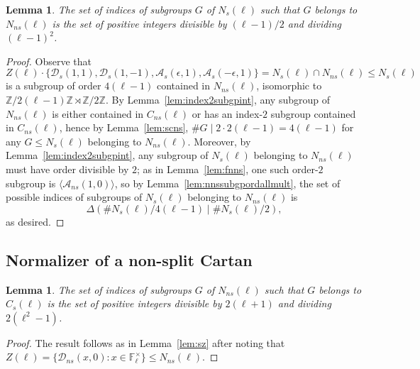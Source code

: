 \documentclass[table,dvipsnames]{amsart}
\newcommand{\F}{\mathbb{F}}
\newcommand{\Z}{\mathbb{Z}}
\newcommand{\angles}[1]{\langle #1\rangle}
\newtheorem{lemma}[theorem]{Lemma}
\numberwithin{equation}{section}
\newcommand{\s}{\textit{s}}
\newcommand{\ns}{\textit{ns}}
\newcommand{\Cs}{C_\s}
\newcommand{\Cns}{C_\ns}
\newcommand{\Ns}{N_\s}
\newcommand{\Nns}{N_\ns}
\begin{document}
\begin{lemma}
\label{lem:snns}
The set of indices of subgroups $G$ of $\Ns(\ell)$ such that $G$ belongs to $\Nns(\ell)$ is the set of positive integers divisible by $(\ell-1)/2$ and dividing $(\ell-1)^2$.
\end{lemma}
\begin{proof}
Observe that
\begin{equation*}
Z(\ell)\cdot\{\mathcal{D}_\s(1,1),\mathcal{D}_\s(1,-1),\mathcal{A}_\s(\epsilon,1),\mathcal{A}_\s(-\epsilon,1)\}=\Ns(\ell)\cap\Nns(\ell)\le\Ns(\ell)
\end{equation*}
is a subgroup of order $4(\ell-1)$ contained in $\Nns(\ell)$, isomorphic to $\Z/2(\ell-1)\Z\rtimes\Z/2\Z$. By Lemma~\ref{lem:index2subgpint}, any subgroup of $\Nns(\ell)$ is either contained in $\Cns(\ell)$ or has an index-$2$ subgroup contained in $\Cns(\ell)$, hence by Lemma~\ref{lem:scns}, $\#G\mid 2\cdot 2(\ell-1)=4(\ell-1)$ for any $G\le\Ns(\ell)$ belonging to $\Nns(\ell)$. Moreover, by Lemma~\ref{lem:index2subgpint}, any subgroup of $\Ns(\ell)$ belonging to $\Nns(\ell)$ must have order divisible by $2$; as in Lemma~\ref{lem:fnns}, one such order-$2$ subgroup is $\angles{\mathcal{A}_\ns(1,0)}$, so by Lemma~\ref{lem:nnssubgpordallmult}, the set of possible indices of subgroups of $\Ns(\ell)$ belonging to $\Nns(\ell)$ is
\begin{equation*}
\Delta(\#\Ns(\ell)/4(\ell-1)\mid\#\Ns(\ell)/2),
\end{equation*}
as desired.
\end{proof}

\subsection{Normalizer of a non-split Cartan}
\label{subsec:n}

\begin{lemma}
\label{lem:nz}
The set of indices of subgroups $G$ of $\Nns(\ell)$ such that $G$ belongs to $\Cs(\ell)$ is the set of positive integers divisible by $2(\ell+1)$ and dividing $2(\ell^2-1)$.
\end{lemma}
\begin{proof}
The result follows as in Lemma~\ref{lem:sz} after noting that $Z(\ell)=\{\mathcal{D}_\ns(x,0):x\in\F_\ell^\times\}\le\Nns(\ell)$.
\end{proof}
\end{document}

